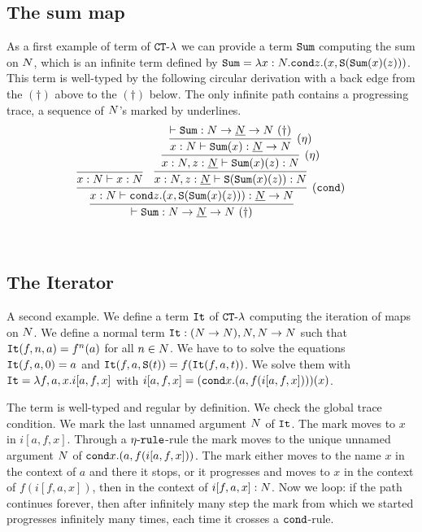 \documentclass{article}
\begin{document}
\subsection{The sum map}
As a first example of term of  ${ {\tt CT} \mbox{-} \lambda}$ we can provide a term ${\tt Sum}$ computing the sum on ${N}$,
which is an infinite term defined by ${\tt Sum} = \lambda x:{N}.{\tt cond} z.(x,{\tt S}({\tt Sum}(x)(z)))$.
This term is well-typed by the following circular derivation with a back edge from the $(\dagger)$ above to the $(\dagger)$ below.
The only infinite path contains a progressing trace, a sequence of ${N}$'s marked by underlines. 
\[
\infer{
  \vdash \Sum:\N \rightarrow \underline{\N} \rightarrow \N\ (\dagger)
}{
  \infer[(\cond)]{
    x:\N \vdash \cond z.(x,\Succ(\Sum(x)(z))): \underline{\N} \rightarrow \N
  }{
    \infer{
      x:\N \vdash x:\N
    }{}
    &
    \infer{
      x:\N,z:\underline{\N} \vdash \Succ(\Sum(x)(z)): \N
    }{
      \infer[(\eta)]{
        x:\N,z:\underline{\N} \vdash \Sum(x)(z): \N
      }{
        \infer[(\eta)]{
          x:\N \vdash \Sum(x): \underline{\N} \rightarrow \N
        }{
          \vdash \Sum: \N \rightarrow \underline{\N} \rightarrow \N\ (\dagger)
        }
      }
    }
  }
}
\]

\\


\subsection{The Iterator}
A second example. We define a term ${\tt It}$ of  ${ {\tt CT} \mbox{-} \lambda}$ computing the iteration of maps on ${N}$.
We define a normal term ${\tt It}:({N} \rightarrow {N}), {N},{N} \rightarrow {N}$ such that
${\tt It}(f,n,a)=f^n(a)$ for all $n \in {N}$. 
We have to to solve the equations ${\tt It}(f,a,0) = a$ and ${\tt It}(f,a,{\tt S} (t)) = f({\tt It}(f,a,t))$.
We solve them with ${\tt It} = \lambda f, a, x. i[a,f,x]$
with $ i[a,f,x] = ({\tt cond} x. (a, f( i[a,f,x]) ))(x)$.

The term is well-typed and regular by definition. We check the global trace condition. 
We mark the last unnamed argument ${N}$ of ${\tt It}$. The mark moves to $x$ in $ i[a,f,x]$.
 Through a ${\eta\mbox{-}\tt rule}$-rule the mark moves to the unique unnamed argument ${N}$ of  
$ {\tt cond} x. (a, f( i[a,f,x]) )$.
The mark either moves to the name $x$ in the context of $a$ and there it stops, or 
it progresses and moves to $x$ in the context of $f(i[f,a,x])$, then in the context of $i[f,a,x]:{N}$.
Now we loop: if the path continues forever, then after infinitely many step the mark from which we started 
progresses infinitely many times, each time it crosses a ${\tt cond}$-rule.
\end{document}
